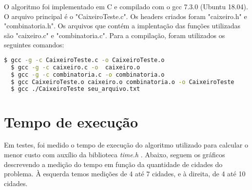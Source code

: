 \documentclass[a4paper, 12pt]{article} %
\begin{document}
		O algoritmo foi implementado em C e compilado com o gcc 7.3.0 (Ubuntu 18.04).	O arquivo principal é o "CaixeiroTeste.c". Os headers criados foram "caixeiro.h" e "combinatoria.h". Os arquivos que contém a implentação das funções utilizadas são "caixeiro.c" e "combinatoria.c". Para a compilação, foram utilizados os seguintes comandos:
		
	\begin{lstlisting}[language=bash]
  $ gcc -g -c CaixeiroTeste.c -o CaixeiroTeste.o
  $ gcc -g -c caixeiro.c -o  caixeiro.o
  $ gcc -g -c combinatoria.c -o combinatoria.o
  $ gcc CaixeiroTeste.o caixeiro.o combinatoria.o -o CaixeiroTeste
  $ gcc ./CaixeiroTeste seu_arquivo.txt
	\end{lstlisting}
		
	\section{Tempo de execução}
	
	Em testes, foi medido o tempo de execução do algoritmo utilizado para calcular o menor custo com auxílio da biblioteca \textit{time.h} . Abaixo, seguem os gráficos descrevendo a medição do tempo em função da quantidade de cidades do problema. À esquerda temos medições de 4 até 7 cidades, e à direita, de 4 até 10 cidades.
	
\begin{flushleft}	
	
	\end{flushleft}
	
\end{document}
